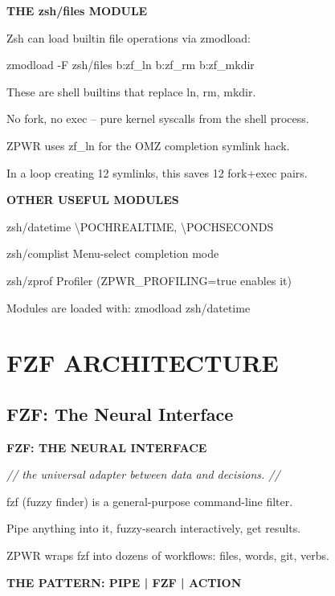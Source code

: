 \documentclass[11pt,a4paper,twoside]{book}
\begin{document}
\vspace{12pt}
{\bfseries\color{neonyellow} THE zsh/files MODULE}\vspace{4pt}

Zsh can load builtin file operations via zmodload:

zmodload -F zsh/files b:zf\_ln b:zf\_rm b:zf\_mkdir

These are shell builtins that replace ln, rm, mkdir.

No fork, no exec -- pure kernel syscalls from the shell process.

ZPWR uses zf\_ln for the OMZ completion symlink hack.

In a loop creating 12 symlinks, this saves 12 fork+exec pairs.


\vspace{12pt}
{\bfseries\color{neonyellow} OTHER USEFUL MODULES}\vspace{4pt}

zsh/datetime    \textbackslash{}POCHREALTIME, \textbackslash{}POCHSECONDS

zsh/complist    Menu-select completion mode

zsh/zprof       Profiler (ZPWR\_PROFILING=true enables it)

Modules are loaded with: zmodload zsh/datetime


\vspace{16pt}


\chapter{FZF ARCHITECTURE}

\section{FZF: The Neural Interface}


\vspace{10pt}
{\large\bfseries\color{neoncyan} FZF: THE NEURAL INTERFACE}\vspace{6pt}

{\small\itshape\color{dimtext} // the universal adapter between data and decisions. //}

fzf (fuzzy finder) is a general-purpose command-line filter.

Pipe anything into it, fuzzy-search interactively, get results.

ZPWR wraps fzf into dozens of workflows: files, words, git, verbs.


\vspace{12pt}
{\bfseries\color{neonyellow} THE PATTERN: PIPE | FZF | ACTION}\vspace{4pt}
\end{document}
